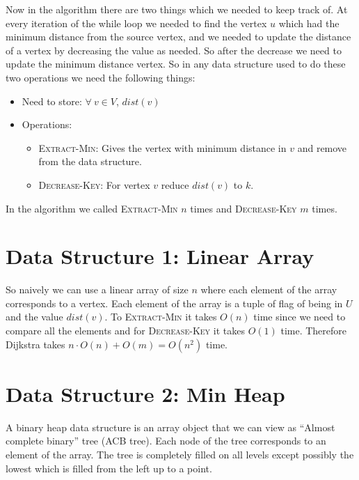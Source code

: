 Now in the algorithm there are two things which we needed to keep track of. At every iteration of the while loop we needed to find the vertex $u$ which had the minimum distance from the source vertex, and we needed to update the distance of a vertex by decreasing the value as needed. So after the decrease we need to update the minimum distance vertex. So in any data structure used to do these two operations we need the following things:\begin{itemize}[label=$\bullet$]
	\item Need to store: $\forall\ v\in V$, $dist(v)$
	\item Operations: \begin{itemize}
		      \item \textsc{Extract-Min}: Gives the vertex with minimum distance in $v$ and remove from the data structure.
		      \item \textsc{Decrease-Key}: For vertex $v$ reduce $dist(v)$ to $k$.
	      \end{itemize}
\end{itemize}\parinf

In the algorithm we called \textsc{Extract-Min} $n$ times and \textsc{Decrease-Key} $m$ times.\parinn

\section{Data Structure 1: Linear Array}
So naively we can use a linear array of size $n$ where each element of the array corresponds to a vertex. Each element of the array is a tuple of flag of being in $U$ and the value $dist(v)$. To \textsc{Extract-Min} it takes $O(n)$ time since we need to compare all the elements and for \textsc{Decrease-Key} it takes $O(1)$ time. Therefore Dijkstra takes $n\cdot O(n)+O(m)=O(n^2)$ time.

\section{Data Structure 2: Min Heap}
A binary heap data structure is an array object that we can view as ``Almost complete binary'' tree (ACB tree). Each node of the tree corresponds to an element of the array. The tree is completely filled on all levels except possibly the lowest which is filled from the left up to a point.

